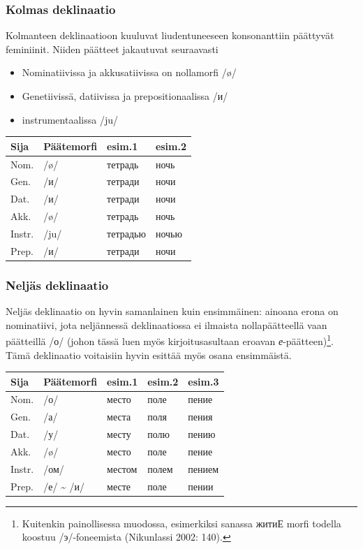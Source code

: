 \documentclass[]{scrartcl}
\providecommand{\tightlist}{%
  \setlength{\itemsep}{0pt}\setlength{\parskip}{0pt}}
\begin{document}
\subsubsection{Kolmas deklinaatio}\label{kolmas-deklinaatio}

Kolmanteen deklinaatioon kuuluvat liudentuneeseen konsonanttiin
päättyvät feminiinit. Niiden päätteet jakautuvat seuraavasti

\begin{itemize}
\tightlist
\item
  Nominatiivissa ja akkusatiivissa on nollamorfi /ø/
\item
  Genetiivissä, datiivissa ja prepositionaalissa /и/
\item
  instrumentaalissa /ju/
\end{itemize}

\begin{longtable}[c]{@{}llll@{}}
\toprule
Sija & Päätemorfi & esim.1 & esim.2\tabularnewline
\midrule
\endhead
Nom. & /ø/ & тетрадь & ночь\tabularnewline
Gen. & /и/ & тетради & ночи\tabularnewline
Dat. & /и/ & тетради & ночи\tabularnewline
Akk. & /ø/ & тетрадь & ночь\tabularnewline
Instr. & /ju/ & тетрадью & ночью\tabularnewline
Prep. & /и/ & тетради & ночи\tabularnewline
\bottomrule
\end{longtable}

\subsubsection{Neljäs deklinaatio}\label{neljuxe4s-deklinaatio}

Neljäs deklinaatio on hyvin samanlainen kuin ensimmäinen: ainoana erona
on nominatiivi, jota neljännessä deklinaatiossa ei ilmaista
nollapäätteellä vaan päätteillä /о/ (johon tässä luen myös
kirjoitusasultaan eroavan \emph{е}-päätteen)\footnote{Kuitenkin
  painollisessa muodossa, esimerkiksi sanassa житиЕ morfi todella
  koostuu /э/-foneemista (Nikunlassi 2002: 140).}. Tämä deklinaatio
voitaisiin hyvin esittää myös osana ensimmäistä.

\begin{longtable}[c]{@{}lllll@{}}
\toprule
Sija & Päätemorfi & esim.1 & esim.2 & esim.3\tabularnewline
\midrule
\endhead
Nom. & /о/ & место & поле & пение\tabularnewline
Gen. & /а/ & места & поля & пения\tabularnewline
Dat. & /у/ & месту & полю & пению\tabularnewline
Akk. & /ø/ & место & поле & пение\tabularnewline
Instr. & /ом/ & местом & полем & пением\tabularnewline
Prep. & /е/ \textasciitilde{} /и/ & месте & поле & пении\tabularnewline
\bottomrule
\end{longtable}
\end{document}
